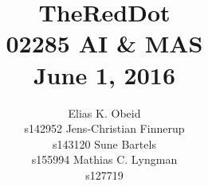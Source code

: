 \documentclass[letterpaper]{article}
\begin{document}
\title{TheRedDot\\02285 AI \& MAS\\{\small June 1, 2016}}
\author{
Elias K. Obeid \\ s142952 \And
Jens-Christian Finnerup \\ s143120 \And 
Sune Bartels \\ s155994 \And 
Mathias C. Lyngman \\ s127719}

\maketitle










\end{document}
